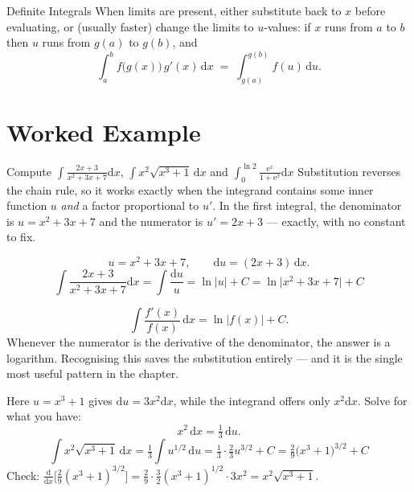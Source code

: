 \begin{rulebox}{Definite Integrals}
When limits are present, either substitute back to $x$ before
evaluating, or (usually faster) change the limits to $u$-values:
if $x$ runs from $a$ to $b$ then $u$ runs from $g(a)$ to $g(b)$, and
\[
  \int_{a}^{b} f\bigl(g(x)\bigr)\,g'(x)\,\mathrm{d}x
    \;=\; \int_{g(a)}^{g(b)} f(u)\,\mathrm{d}u .
\]
\end{rulebox}

\section{Worked Example}

\begin{worked}{Compute $\displaystyle\int\frac{2x+3}{x^{2}+3x+7}\mathrm{d}x$, $\displaystyle\int x^{2}\sqrt{x^{3}+1}\,\mathrm{d}x$ and $\displaystyle\int_{0}^{\ln2}\frac{\mathrm{e}^{x}}{1+\mathrm{e}^{x}}\mathrm{d}x$}
Substitution reverses the chain rule, so it works exactly when the integrand
contains some inner function $u$ \emph{and} a factor proportional to $u'$.
In the first integral, the denominator is $u=x^{2}+3x+7$ and the numerator
is $u'=2x+3$ --- exactly, with no constant to fix.

\[
  u=x^{2}+3x+7,\qquad \mathrm{d}u=(2x+3)\,\mathrm{d}x .
\]
\[
  \int\frac{2x+3}{x^{2}+3x+7}\mathrm{d}x=\int\frac{\mathrm{d}u}{u}=\ln|u|+C
  =\boxed{\ln\bigl|x^{2}+3x+7\bigr|+C}
\]

\[
  \int\frac{f'(x)}{f(x)}\,\mathrm{d}x=\ln|f(x)|+C .
\]
Whenever the numerator is the derivative of the denominator, the answer is a
logarithm. Recognising this saves the substitution entirely --- and it is
the single most useful pattern in the chapter.

Here $u=x^{3}+1$ gives $\mathrm{d}u=3x^{2}\mathrm{d}x$, while the integrand
offers only $x^{2}\mathrm{d}x$. Solve for what you have:
\[
  x^{2}\,\mathrm{d}x=\tfrac13\,\mathrm{d}u .
\]
\[
  \int x^{2}\sqrt{x^{3}+1}\,\mathrm{d}x
  =\tfrac13\int u^{1/2}\,\mathrm{d}u
  =\tfrac13\cdot\tfrac23u^{3/2}+C
  =\boxed{\tfrac29\bigl(x^{3}+1\bigr)^{3/2}+C}
\]
Check: $\frac{\mathrm{d}}{\mathrm{d}x}\bigl[\tfrac29(x^{3}+1)^{3/2}\bigr]
=\tfrac29\cdot\tfrac32(x^{3}+1)^{1/2}\cdot3x^{2}=x^{2}\sqrt{x^{3}+1}$.
\checkmark
{}


\end{worked}

